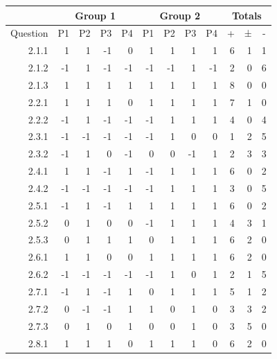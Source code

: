 \documentclass[12pt,twoside,notitlepage,xetex]{report}
\begin{document}
\begin{center}
\begin{table}[H]
\begin{center}
\begin{tabular}{|r||r|r|r|r||r|r|r|r||r|r|r|}
\cline{2-12}
\multicolumn{1}{c}{} & \multicolumn{4}{|c|}{Group 1} & \multicolumn{4}{c||}{Group 2} & \multicolumn{3}{c|}{Totals}\\ \hline
\multicolumn{1}{|c||}{Question} & \multicolumn{1}{c|}{P1} & \multicolumn{1}{c|}{P2} & \multicolumn{1}{c|}{P3} & \multicolumn{1}{c||}{P4} & \multicolumn{1}{c|}{P1} & \multicolumn{1}{c|}{P2} & \multicolumn{1}{c|}{P3} & \multicolumn{1}{c||}{P4} & \multicolumn{1}{c|}{+} & \multicolumn{1}{c|}{±} & \multicolumn{1}{c|}{-}\\ \hline \hline
2.1.1 & 1 & 1 & -1 & 0 & 1 & 1 & 1 & 1 & 6 & 1 & 1\\ \hline
2.1.2 & -1 & 1 & -1 & -1 & -1 & -1 & 1 & -1 & 2 & 0 & 6\\ \hline
2.1.3 & 1 & 1 & 1 & 1 & 1 & 1 & 1 & 1 & 8 & 0 & 0\\ \hline
2.2.1 & 1 & 1 & 1 & 0 & 1 & 1 & 1 & 1 & 7 & 1 & 0\\ \hline
2.2.2 & -1 & 1 & -1 & -1 & -1 & 1 & 1 & 1 & 4 & 0 & 4\\ \hline
2.3.1 & -1 & -1 & -1 & -1 & -1 & 1 & 0 & 0 & 1 & 2 & 5\\ \hline
2.3.2 & -1 & 1 & 0 & -1 & 0 & 0 & -1 & 1 & 2 & 3 & 3\\ \hline
2.4.1 & 1 & 1 & -1 & 1 & -1 & 1 & 1 & 1 & 6 & 0 & 2\\ \hline
2.4.2 & -1 & -1 & -1 & -1 & -1 & 1 & 1 & 1 & 3 & 0 & 5\\ \hline
2.5.1 & -1 & 1 & -1 & 1 & 1 & 1 & 1 & 1 & 6 & 0 & 2\\ \hline
2.5.2 & 0 & 1 & 0 & 0 & -1 & 1 & 1 & 1 & 4 & 3 & 1\\ \hline
2.5.3 & 0 & 1 & 1 & 1 & 0 & 1 & 1 & 1 & 6 & 2 & 0\\ \hline
2.6.1 & 1 & 1 & 0 & 0 & 1 & 1 & 1 & 1 & 6 & 2 & 0\\ \hline
2.6.2 & -1 & -1 & -1 & -1 & -1 & 1 & 0 & 1 & 2 & 1 & 5\\ \hline
2.7.1 & -1 & 1 & -1 & 1 & 0 & 1 & 1 & 1 & 5 & 1 & 2\\ \hline
2.7.2 & 0 & -1 & -1 & 1 & 1 & 0 & 1 & 0 & 3 & 3 & 2\\ \hline
2.7.3 & 0 & 1 & 0 & 1 & 0 & 0 & 1 & 0 & 3 & 5 & 0\\ \hline
2.8.1 & 1 & 1 & 1 & 0 & 1 & 1 & 1 & 0 & 6 & 2 & 0\\ \hline

\end{tabular}
\end{center}
\end{table}
\end{center}
\end{document}
